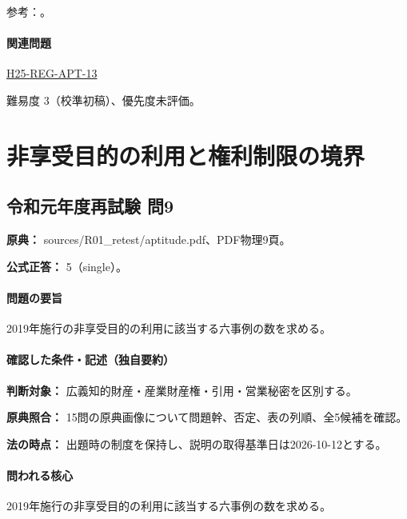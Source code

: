 \par 参考：\cite{ip_copyright_statute}。

\paragraph{関連問題} \hyperref[q:h25-reg-apt-13]{H25-REG-APT-13}

\par 難易度 3（校準初稿）、優先度未評価。

\section{非享受目的の利用と権利制限の境界}

\subsection{令和元年度再試験 問9}
\label{q:r01-ret-apt-09}

\noindent\textbf{原典：} sources/R01\_retest/aptitude.pdf、PDF物理9頁。

\textbf{公式正答：} 5（single）。

\paragraph{問題の要旨} 2019年施行の非享受目的の利用に該当する六事例の数を求める。

\paragraph{確認した条件・記述（独自要約）}\mbox{}\par

\noindent\textbf{判断対象：} 広義知的財産・産業財産権・引用・営業秘密を区別する。\par

\noindent\textbf{原典照合：} 15問の原典画像について問題幹、否定、表の列順、全5候補を確認。\par

\noindent\textbf{法の時点：} 出題時の制度を保持し、説明の取得基準日は2026-10-12とする。\par

\paragraph{問われる核心} 2019年施行の非享受目的の利用に該当する六事例の数を求める。

